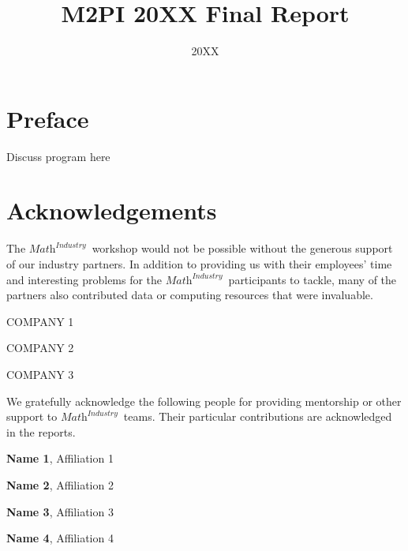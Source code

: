 \documentclass[11pt]{report}
\title{M2PI 20XX Final Report}
\author{}
\date{20XX}
\begin{document}
\newcommand{\mtopi}{$\textit{Math}^\textit{Industry}$~}
\newcommand{\person}[2]{\textbf{#1}, #2}
\sectionfont{\centering\sc\MakeLowercase}

\maketitle

\section*{Preface}
    Discuss program here

\newpage

\section*{Acknowledgements}
The \mtopi workshop would not be possible without
the generous support of our industry partners. In addition to providing us with
their employees' time and interesting problems for the
\mtopi participants to tackle, many of the partners
also contributed data or computing resources that were invaluable.

\noindent\hrulefill

\begin{multicols}{2}
    \begin{flushleft}
        \uppercase{Company 1}
        
        \uppercase{Company 2}
     
        \uppercase{Company 3}
    \end{flushleft}
 \end{multicols}

\noindent\hrulefill

We gratefully acknowledge the following people for providing mentorship or
other support to \mtopi teams. Their particular contributions are acknowledged
in the reports.

\noindent\hrulefill

\begin{multicols}{2}
    \begin{flushleft} 
        \person{Name 1}{Affiliation 1}

        \person{Name 2}{Affiliation 2}

        \person{Name 3}{Affiliation 3}

        \person{Name 4}{Affiliation 4}
    \end{flushleft}
\end{multicols}
\end{document}
